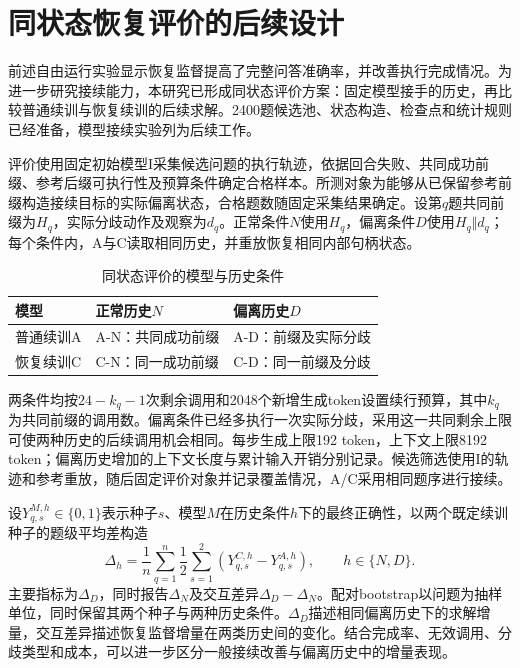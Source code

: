 \section{同状态恢复评价的后续设计}
\label{sec:same-state-design}

前述自由运行实验显示恢复监督提高了完整问答准确率，并改善执行完成情况。为进一步研究接续能力，本研究已形成同状态评价方案：固定模型接手的历史，再比较普通续训与恢复续训的后续求解。2400题候选池、状态构造、检查点和统计规则已经准备，模型接续实验列为后续工作。

评价使用固定初始模型I采集候选问题的执行轨迹，依据回合失败、共同成功前缀、参考后缀可执行性及预算条件确定合格样本。所测对象为能够从已保留参考前缀构造接续目标的实际偏离状态，合格题数随固定采集结果确定。设第$q$题共同前缀为$H_q$，实际分歧动作及观察为$d_q$。正常条件$N$使用$H_q$，偏离条件$D$使用$H_q\Vert d_q$；每个条件内，A与C读取相同历史，并重放恢复相同内部句柄状态。

\begin{table}[htbp]
\centering\small
\caption{同状态评价的模型与历史条件}
\label{tab:same-state-factorial}
\begin{tabular}{lll}
\toprule
模型 & 正常历史$N$ & 偏离历史$D$\\
\midrule
普通续训A & A-N：共同成功前缀 & A-D：前缀及实际分歧\\
恢复续训C & C-N：同一成功前缀 & C-D：同一前缀及分歧\\
\bottomrule
\end{tabular}
\end{table}

两条件均按$24-k_q-1$次剩余调用和2048个新增生成token设置续行预算，其中$k_q$为共同前缀的调用数。偏离条件已经多执行一次实际分歧，采用这一共同剩余上限可使两种历史的后续调用机会相同。每步生成上限192 token，上下文上限8192 token；偏离历史增加的上下文长度与累计输入开销分别记录。候选筛选使用I的轨迹和参考重放，随后固定评价对象并记录覆盖情况，A/C采用相同题序进行接续。

设$Y_{q,s}^{M,h}\in\{0,1\}$表示种子$s$、模型$M$在历史条件$h$下的最终正确性，以两个既定续训种子的题级平均差构造
\begin{equation}
 \Delta_h=\frac{1}{n}\sum_{q=1}^{n}\frac{1}{2}\sum_{s=1}^{2}
 \left(Y_{q,s}^{C,h}-Y_{q,s}^{A,h}\right),\qquad h\in\{N,D\}.
\end{equation}
主要指标为$\Delta_D$，同时报告$\Delta_N$及交互差异$\Delta_D-\Delta_N$。配对bootstrap以问题为抽样单位，同时保留其两个种子与两种历史条件。$\Delta_D$描述相同偏离历史下的求解增量，交互差异描述恢复监督增量在两类历史间的变化。结合完成率、无效调用、分歧类型和成本，可以进一步区分一般接续改善与偏离历史中的增量表现。
